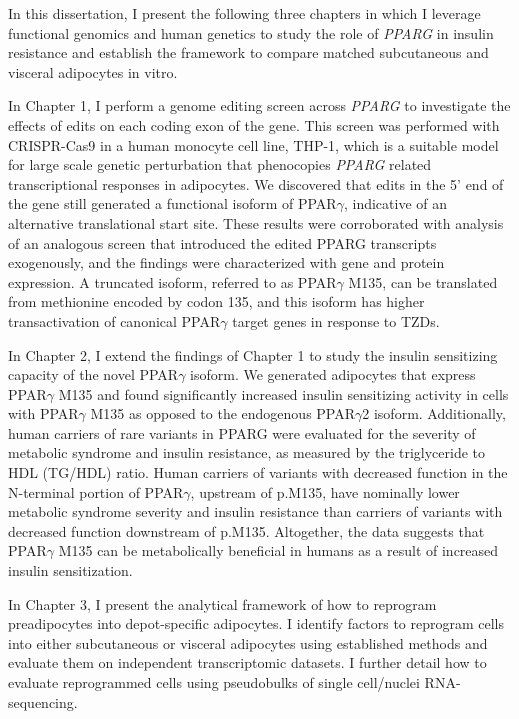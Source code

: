 \begin{dissertationintroduction}
In this dissertation, I present the following three chapters in which I leverage functional genomics and human genetics to study the role of \textit{PPARG} in insulin resistance and establish the framework to compare matched subcutaneous and visceral adipocytes in vitro.  

In Chapter 1, I perform a genome editing screen across \textit{PPARG} to investigate the effects of edits on each coding exon of the gene. This screen was performed with CRISPR-Cas9 in a human monocyte cell line, THP-1, which is a suitable model for large scale genetic perturbation that phenocopies \textit{PPARG} related transcriptional responses in adipocytes\cite{Majithia2016-bm,Agostini2018-bx}. We discovered that edits in the 5’ end of the gene still generated a functional isoform of PPAR$\gamma$, indicative of an alternative translational start site. These results were corroborated with analysis of an analogous screen that introduced the edited PPARG transcripts exogenously, and the findings were characterized with gene and protein expression. A truncated isoform, referred to as PPAR$\gamma$ M135, can be translated from methionine encoded by codon 135, and this isoform has higher transactivation of canonical PPAR$\gamma$ target genes in response to TZDs.  

In Chapter 2, I extend the findings of Chapter 1 to study the insulin sensitizing capacity of the novel PPAR$\gamma$ isoform. We generated adipocytes that express PPAR$\gamma$ M135 and found significantly increased insulin sensitizing activity in cells with PPAR$\gamma$ M135 as opposed to the endogenous PPAR$\gamma$2 isoform. Additionally, human carriers of rare variants in PPARG were evaluated for the severity of metabolic syndrome and insulin resistance, as measured by the triglyceride to HDL (TG/HDL) ratio. Human carriers of variants with decreased function in the N-terminal portion of PPAR$\gamma$, upstream of p.M135, have nominally lower metabolic syndrome severity and insulin resistance than carriers of variants with decreased function downstream of p.M135. Altogether, the data suggests that PPAR$\gamma$ M135 can be metabolically beneficial in humans as a result of increased insulin sensitization.   

In Chapter 3, I present the analytical framework of how to reprogram preadipocytes into depot-specific adipocytes. I identify factors to reprogram cells into either subcutaneous or visceral adipocytes using established methods and evaluate them on independent transcriptomic datasets. I further detail how to evaluate reprogrammed cells using pseudobulks of single cell/nuclei RNA-sequencing.   


\end{dissertationintroduction}
